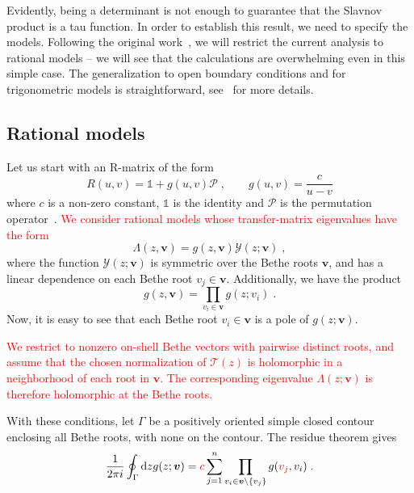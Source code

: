 \documentclass[a4paper,11pt]{amsart}
\begin{document}
Evidently, being a determinant is not enough to guarantee that the
Slavnov product is a tau function.  In order to establish this
result, we need to specify the models. Following the original
work~\cite{Belliard:2019bfz}, we will restrict the current analysis to rational models
-- we will see that the calculations are overwhelming even in this
simple case. The generalization to open boundary conditions and for
trigonometric models is straightforward, see~\cite{Slavnov:2019aba} for more
details.

\subsection{Rational models}

Let us start with an R-matrix of the form
\begin{equation}
  R(u,v) = \mathbb{1} + g(u,v) \mathcal{P}\; , \qquad
  g(u,v) = \frac{c}{u - v}
\end{equation}
where \(c\) is a non-zero constant, \(\mathbb{1}\) is the identity and
\(\mathcal{P}\) is the permutation operator~\cite{Slavnov:2019aba}.
\textcolor{red}{We consider rational models whose transfer-matrix eigenvalues have the form}
\begin{equation}
  \Lambda(z, \bm{v}) = g(z, \bm{v}) \mathcal{Y}(z; \bm{v})\; ,
\end{equation}
where the function \(\mathcal{Y}(z; \bm{v})\) is symmetric over the Bethe roots \(\bm{v}\), and has
a linear dependence on each Bethe root \(v_j \in \bm{v}\).
Additionally, we have the product 
\begin{equation}
  g(z, \bm{v}) = \prod_{v_i\in \bm{v}} g(z; v_i)\; . 
\end{equation}
Now, it is easy to see that each Bethe root \( v_i \in \bm{v}\) is a pole of
\(g(z;\bm{v})\).

\textcolor{red}{We restrict to nonzero
  on-shell Bethe vectors with pairwise distinct roots, and assume that the chosen normalization of
  \(\mathcal{T}(z)\) is holomorphic in a neighborhood of each root in \(\bm{v}\). The corresponding
  eigenvalue \(\Lambda(z;\bm v)\) is therefore holomorphic at the Bethe roots.}

With these conditions, let \(\Gamma\) be a positively oriented simple closed contour enclosing
all Bethe roots, with none on the contour. The residue theorem gives
\begin{equation}
  \frac{1}{2 \pi i}\oint_{\Gamma} \mathrm{d}z g(z; \bm{v}) = {\color{red} c}\sum_{j=1}^n
  \prod_{v_i \in \bm{v}\setminus \{v_j\}} g(\textcolor{red}{v_j}, v_i)\; .
\end{equation}
\end{document}
